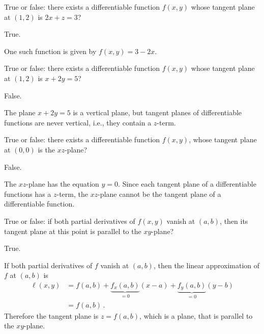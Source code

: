 \begin{question}
True or false: there exists a differentiable function $f(x,y)$ whose tangent plane at $(1, 2)$ is $2x + z= 3$?
\end{question}

\begin{solution}
True.

One such function is given by $f(x,y) = 3 - 2x$.
\end{solution}

\begin{question}
True or false: there exists a differentiable function $f(x,y)$ whose tangent plane at $(1,2)$ is $x + 2y = 5$?
\end{question}

\begin{solution}
False.

The plane $x + 2y = 5$ is a vertical plane, but tangent planes of differentiable functions are never vertical, i.e., they contain a $z$-term.
\end{solution}

\begin{question}
True or false: there exists a differentiable function $f(x,y)$, whose tangent plane at $(0,0)$ is the $xz$-plane?
\end{question}

\begin{solution}
False.

The $xz$-plane has the equation $y=0$. Since each tangent plane of a differentiable functions has a $z$-term, the $xz$-plane cannot be the tangent plane of a differentiable function.
\end{solution}

\begin{question}
True or false: if both partial derivatives of $f(x,y)$ vanish at $(a,b)$, then its tangent plane at this point is parallel to the $xy$-plane?
\end{question}

\begin{solution}
True.

If both partial derivatives of $f$ vanish at $(a,b)$, then the linear approximation of $f$ at $(a,b)$ is
\begin{align*}
\ell(x,y) &= f(a,b) + \underbrace{f_x(a,b)}_{=0}(x-a) + \underbrace{f_y(a,b)}_{=0}(y-b) \\
&= f(a,b)\,.
\end{align*}
Therefore the tangent plane is $z=f(a,b)$, which is a plane, that is parallel to the $xy$-plane.
\end{solution}

